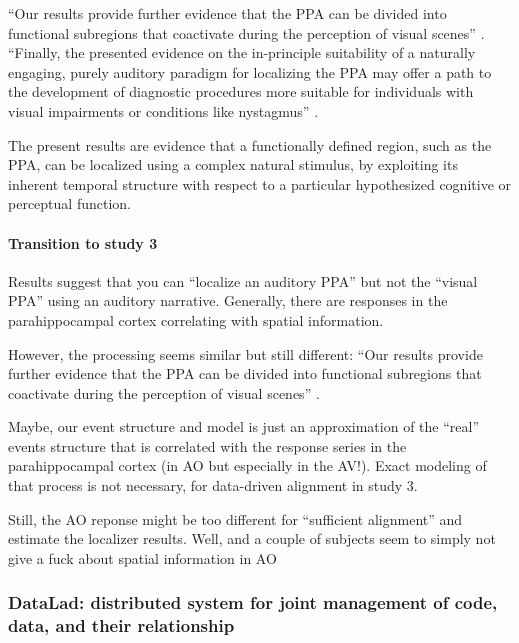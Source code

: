 %
``Our results provide further evidence that the PPA can be divided into
functional subregions that coactivate during the perception of visual scenes''
\citep{haeusler2022processing}.
%
``Finally, the presented evidence on the in-principle suitability of a naturally
engaging, purely auditory paradigm for localizing the PPA may offer a path to
the development of diagnostic procedures more suitable for individuals with
visual impairments or conditions like nystagmus''
\citep{haeusler2022processing}.

%
The present results are evidence that a functionally defined region, such as the
PPA, can be localized using a complex natural stimulus, by exploiting its
inherent temporal structure with respect to a particular hypothesized cognitive
or perceptual function.

\paragraph{Transition to study 3}

%
Results suggest that you can ``localize an auditory PPA'' but not the ``visual
PPA'' using an auditory narrative.
%
Generally, there are responses in the parahippocampal cortex correlating with
spatial information.

However, the processing seems similar but still different: ``Our results provide
further evidence that the PPA can be divided into functional subregions that
coactivate during the perception of visual scenes''
\citep{haeusler2022processing}.

%
Maybe, our event structure and model is just an approximation of the ``real''
events structure that is correlated with the response series in the
parahippocampal cortex (in AO but especially in the AV!).
%
Exact modeling of that process is not necessary, for data-driven alignment in
study 3.

%
Still, the AO reponse might be too different for ``sufficient alignment'' and
estimate the localizer results.
%
Well, and a couple of subjects seem to simply not give a fuck about spatial
information in AO


\subsubsection{DataLad: distributed system for joint management of code, data,
and their relationship}



